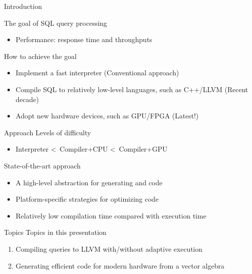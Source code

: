 \begin{frame}{Introduction}

The goal of SQL query processing

\pause
\begin{itemize}
\item Performance:  response time and  throughputs
\end{itemize}

\pause
How to achieve the goal

\begin{itemize}
\pause
\item Implement a fast interpreter (Conventional approach)
\pause
\item Compile SQL to relatively low-level languages, such as C++/LLVM (Recent decade)
\pause
\item Adopt new hardware devices, such as GPU/FPGA (Latest!)
\end{itemize}
\end{frame}

\begin{frame}{Approach} 
Levels of difficulty 
\begin{itemize}
\item Interpreter \textless\ Compiler+CPU \textless\ Compiler+GPU
\end{itemize} 
\pause
State-of-the-art approach
\begin{itemize} 
\item A high-level abstraction for generating  and
 code
\item Platform-specific strategies for optimizing code
\item Relatively low compilation time compared with execution time
\end{itemize} 
\end{frame}

\begin{frame}{Topics} 
Topics in this presentation
\begin{enumerate}
\item Compiling queries to LLVM with/without adaptive execution
\item Generating efficient code for modern hardware from a vector algebra 
\end{enumerate}
\end{frame}

